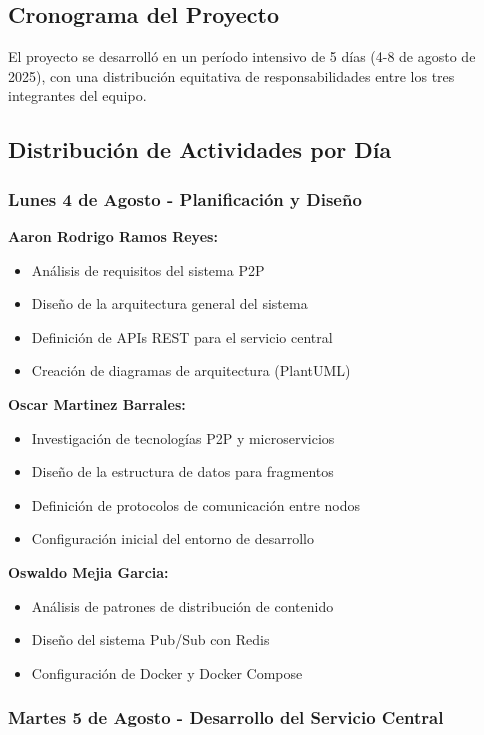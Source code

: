 \subsection*{Cronograma del Proyecto}

El proyecto se desarrolló en un período intensivo de 5 días (4-8 de agosto de 2025), con una distribución equitativa de responsabilidades entre los tres integrantes del equipo.

\subsection*{Distribución de Actividades por Día}

\subsubsection*{Lunes 4 de Agosto - Planificación y Diseño}

\textbf{Aaron Rodrigo Ramos Reyes:}
\begin{itemize}
    \item Análisis de requisitos del sistema P2P
    \item Diseño de la arquitectura general del sistema
    \item Definición de APIs REST para el servicio central
    \item Creación de diagramas de arquitectura (PlantUML)
\end{itemize}

\textbf{Oscar Martinez Barrales:}
\begin{itemize}
    \item Investigación de tecnologías P2P y microservicios
    \item Diseño de la estructura de datos para fragmentos
    \item Definición de protocolos de comunicación entre nodos
    \item Configuración inicial del entorno de desarrollo
\end{itemize}

\textbf{Oswaldo Mejia Garcia:}
\begin{itemize}
    \item Análisis de patrones de distribución de contenido
    \item Diseño del sistema Pub/Sub con Redis
    \item Configuración de Docker y Docker Compose
\end{itemize}

\subsubsection*{Martes 5 de Agosto - Desarrollo del Servicio Central}

